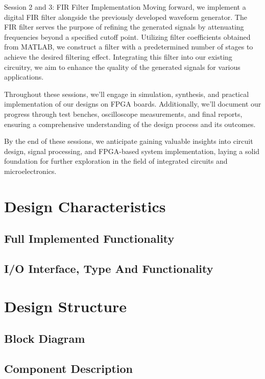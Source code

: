\documentclass[a4paper, 12pt]{article}
\begin{document}
Session 2 and 3: FIR Filter Implementation
Moving forward, we implement a digital FIR filter alongside the previously developed waveform generator. The FIR filter serves the purpose of refining the generated signals by attenuating frequencies beyond a specified cutoff point. Utilizing filter coefficients obtained from MATLAB, we construct a filter with a predetermined number of stages to achieve the desired filtering effect. Integrating this filter into our existing circuitry, we aim to enhance the quality of the generated signals for various applications.

Throughout these sessions, we'll engage in simulation, synthesis, and practical implementation of our designs on FPGA boards. Additionally, we'll document our progress through test benches, oscilloscope measurements, and final reports, ensuring a comprehensive understanding of the design process and its outcomes.

By the end of these sessions, we anticipate gaining valuable insights into circuit design, signal processing, and FPGA-based system implementation, laying a solid foundation for further exploration in the field of integrated circuits and microelectronics.
\section{Design Characteristics}
\label{sec:orgdfa6626}

\subsection{Full Implemented Functionality}
\label{sec:org8fb0e74}

\subsection{I/O Interface, Type And Functionality}
\label{sec:org16bd348}
\section{Design Structure}
\label{sec:orge083825}

\subsection{Block Diagram}
\label{sec:orgdda28f4}

\subsection{Component Description}
\label{sec:org6575ba1}
\end{document}
